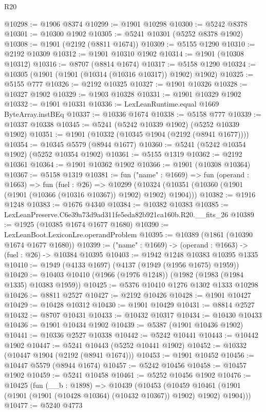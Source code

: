 \begin{lexlean}{R20}
\begin{coremodule}
@10298 := @1906 @8374
@10299 := @1901 @10298
@10300 := @5242 @8378
@10301 := @10300 @1902
@10305 := @5241 @10301 (@5252 @8378 @1902)
@10308 := @1901 (@2192 (@8811 @1674))
@10309 := @5155 @1290
@10310 := @2192 @10309
@10312 := @1901 @10310 @1902
@10314 := @1901 (@10308 @10312)
@10316 := @8707 (@8814 @1674)
@10317 := @5158 @1290
@10324 := @10305 (@1901 (@1901 (@10314 (@10316 @10317)) @1902) @1902)
@10325 := @5155 @777
@10326 := @2192 @10325
@10327 := @1901 @10326
@10328 := @10327 @1902
@10329 := @1903 @10328
@10331 := @1901 @10329 @1902
@10332 := @1901 @10331
@10336 := LexLeanRuntime.equal @1669 ByteArray.instBEq
@10337 := @10336 @1674
@10338 := @5158 @777
@10339 := @10337 @10338
@10345 := @5241 (@5242 @10339 @1902) (@5252 @10339 @1902)
@10351 := @1901 (@10332 (@10345 @1904 (@2192 (@8941 @1677))))
@10354 := @10345 @5579 (@8944 @1677)
@10360 := @5241 (@5242 @10354 @1902) (@5252 @10354 @1902)
@10361 := @5155 @1319
@10362 := @2192 @10361
@10364 := @1901 @10362 @1902
@10366 := @1901 (@10308 @10364)
@10367 := @5158 @1319
@10381 := fun ("name" : @1669) =>
  fun (operand : @1663) =>
  fun (fuel : @26) =>
  @10299 (@10324 (@10351 (@10360 (@1901 (@1901 (@10366 (@10316 @10367)) @1902) @1902) @1904)))
@10382 := @1916 @1248
@10383 := @1676 @4340
@10384 := @10382 @10383
@10385 := LexLeanPreserve.C6e39a73d9ad311fe5eda82b921ca160b.R20.__fits_26
@10389 := @1925 (@10385 @1674 @1677 @1680)
@10390 := LexLeanBoot.LexiconLre.operandProblem
@10395 := @10389 (@1861 (@10390 @1674 @1677 @1680))
@10399 := ("name" : @1669) -> (operand : @1663) -> (fuel : @26) -> @10384 @10395
@10403 := @1942 @1248 @10383 @10395 @1335
@10410 := @1949 (@4133 @1697) (@4137 (@1949 (@1956 @1675) @1959))
@10420 := @10403 @10410 (@1966 (@1976 @1248)) (@1982 (@1983 (@1984 @1335) @10383 @1959))
@10425 := @5376 @10410 @1276 @1302 @1333 @10298
@10426 := @8811 @2527
@10427 := @2192 @10426
@10428 := @1901 @10427
@10429 := @10428 @10312
@10430 := @1901 @10429
@10431 := @8814 @2527
@10432 := @8707 @10431
@10433 := @10432 @10317
@10434 := @10430 @10433
@10436 := @1901 @10434 @1902
@10439 := @5387 (@1901 @10436 @1902)
@10441 := @10336 @2527 @10338
@10442 := @5242 @10441
@10443 := @10442 @1902
@10447 := @5241 @10443 (@5252 @10441 @1902)
@10452 := @10332 (@10447 @1904 (@2192 (@8941 @1674)))
@10453 := @1901 @10452
@10456 := @10447 @5579 (@8944 @1674)
@10457 := @5242 @10456
@10458 := @10457 @1902
@10459 := @5241 @10458
@10461 := @5252 @10456 @1902
@10476 := @10425
    (fun (__b : @1898) =>
    @10439
      (@10453
        (@10459 @10461 (@1901 (@1901 (@1901 (@10428 @10364) (@10432 @10367)) @1902) @1902) @1904)))
@10477 := @5240 @4773

\end{coremodule}
\end{lexlean}
